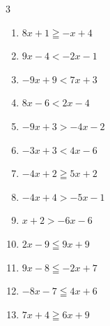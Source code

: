 \begin{multicols}{3}
\begin{enumerate}

  \item $8x+1\geqq -x+4$


  \item $9x-4<-2x-1$


  \item $-9x+9<7x+3$


\columnbreak %

  \item $8x-6<2x-4$


  \item $-9x+3>-4x-2$

        \phantom{$\displaystyle x<1$}

  \item $-3x+3<4x-6$


  \item $-4x+2\geqq 5x+2$

        \phantom{$\displaystyle x\leqq 0$}

  \item $-4x+4>-5x-1$

        \phantom{$\displaystyle x>-5$}

  \item $x+2>-6x-6$


  \item $2x-9\leqq 9x+9$


  \item $9x-8\leqq -2x+7$


  \item $-8x-7\leqq 4x+6$


  \item $7x+4\geqq 6x+9$

        \phantom{$\displaystyle x\geqq 5$}


\end{enumerate}
\end{multicols}
